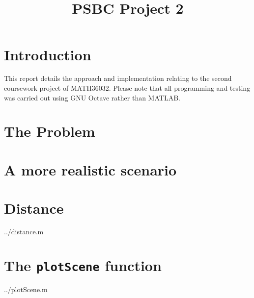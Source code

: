 \documentclass[10pt]{article}
\title{PSBC Project 2}
\newcommand{\inlinemaketitle}{{\let\newpage\relax\maketitle}}
\begin{document}
\inlinemaketitle
\section{Introduction}

This report details the approach and implementation relating to the second coursework project of MATH36032. Please note that all programming and testing was carried out using GNU Octave rather than MATLAB.

\section{The Problem}



\section{A more realistic scenario}


\begin{appendices}

\section{Distance}\label{ap:distance}
  {../distance.m}


\section{The \texttt{plotScene} function}\label{ap:plotScene}
  {../plotScene.m}
\end{appendices}


\begin{thebibliography}{9}
\end{thebibliography}
\end{document}
